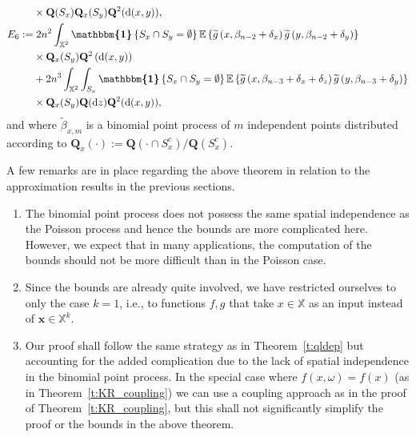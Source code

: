 \documentclass[AHL,Unicode,longabstracts]{cedram}
\newcommand{\bx}{\mathbf{x}}
\newcommand{\bQ}{\mathbf{Q}}
\newcommand*\X{\mathbb{X}}
\newcommand{\E}{\mathbb{E}}
\newcommand*\md{\mathrm{d}}
\newcommand{\mean}[1] {\E\left\{{#1}\right\}}
\newcommand{\ind}{\boldsymbol{\mathbbm{1}}}
\newcommand{\tg}{\tilde{g}}
\let\oldtilde\tilde
\renewcommand*{\tilde}[1]{\mathchoice{\widetilde{#1}}{\widetilde{#1}}{\oldtilde{#1}}{\oldtilde{#1}}}
\begin{document}
\begin{theo}
\begin{align*}
&\times \bQ(S_x) \bQ_x(S_y) \bQ^2(\md(x,y)), \allowdisplaybreaks \\
E_6 :=&\; 2n^2 \int_{\X^2} \ind\left\{S_x\cap S_y=\emptyset\right\} \mean{ \tg\left(x,\beta_{n-2}+\delta_x\right) \tg\left(y,\beta_{n-2}+\delta_y\right) }\\
& \times\bQ_x(S_y) \bQ^2\left(\md(x,y)\right) \\
& + 2n^3 \int_{\X^2} \int_{S_x} \ind\left\{S_x\cap S_y=\emptyset\right\} \mean{ \tg\left(x,\beta_{n-3}+\delta_x+\delta_z\right) \tg\left(y,\beta_{n-3}+\delta_y\right) } \\
& \times\bQ_x(S_y) \bQ(\md z) \bQ^2(\md(x,y)), 
\end{align*}
and where $\widetilde{\beta}_{x,m}$ is a binomial point process of $m$ independent points distributed according to $\bQ_x(\cdot):=\bQ(\cdot\cap S_x^c)/\bQ(S_x^c)$.
\end{theo}

\begin{rema}\label{r:krbin}
A few remarks are in place regarding the above theorem in relation to the approximation results in the previous sections.
\begin{enumerate}
\item The binomial point process does not possess the same spatial independence as the Poisson process and hence the bounds are more complicated here. However, we expect that in many applications, the computation of the bounds should not be more difficult than in the Poisson case.

\item Since the bounds are already quite involved, we have restricted ourselves to only the case $k=1$, i.e., to functions $f,g$ that take $x \in \X$ as an input instead of $\bx \in \X^k$.

\item Our proof shall follow the same strategy as in Theorem~\ref{t:qldep} but accounting for the added complication due to the lack of spatial independence in the binomial point process. In the special case where $f(x,\omega) = f(x)$ (as in Theorem~\ref{t:KR_coupling}) we can use a coupling approach as in the proof of Theorem~\ref{t:KR_coupling}, but this shall not significantly simplify the proof or the bounds in the above theorem.
\end{enumerate}
\end{rema}
\end{document}

